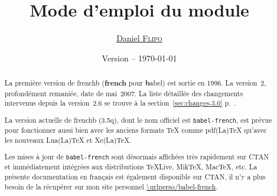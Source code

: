 \documentclass[a4paper,12pt,german,english,french]{article}
\title{Mode d’emploi du module \ext{babel-french}}
\author{\href{mailto:daniel.flipo@free.fr}{Daniel \textsc{Flipo}}}
\date{Version {\latestversion} -- \today}
\def\ColorVerb{\color{MidnightBlue}}
\newcommand*{\ext}[1]{\texttt{\ColorVerb #1}}
\newcommand*{\latestversion}{3.5q}
\begin{document}
\maketitle
\thispagestyle{empty}

\begin{abstract}
  La première version de frenchb (\textbf{french} pour \textbf{b}abel) est
  sortie en 1996.  La version~2, profondément remaniée, date de mai~2007.
  La liste détaillée des changements intervenus depuis la version~2.6 se
  trouve à la section~\ref{sec:changes-3.0} p.~\pageref{sec:changes-3.0}.

  La version actuelle de frenchb (\latestversion), dont le nom officiel est
  \ext{babel-french}, est prévue pour fonctionner aussi bien avec les anciens
  formats TeX comme pdf(La)TeX qu’avec les nouveaux Lua(La)TeX et Xe(La)TeX.

  Les mises à jour de \ext{babel-french} sont désormais affichées très
  rapidement sur CTAN et immédiatement intégrées aux distributions TeXLive,
  MikTeX, MacTeX, etc.
  La présente documentation en français est également disponible sur CTAN,
  il n’y a plus besoin de la récupérer sur mon site
  personnel {\expandafter\expandafter\expandafter\url{\urlperso/babel-french}}.
\end{abstract}
\end{document}
